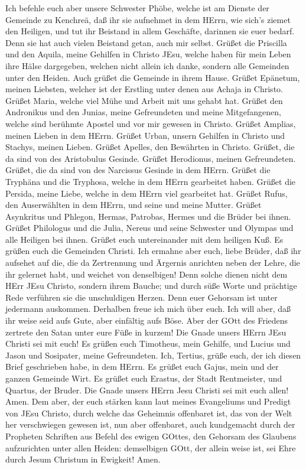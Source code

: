  Ich befehle euch aber unsere Schwester Phöbe, welche ist am
Dienste der Gemeinde zu Kenchreä,  daß ihr sie aufnehmet in
dem HErrn, wie sich's ziemet den Heiligen, und tut ihr Beistand in allem
Geschäfte, darinnen sie euer bedarf. Denn sie hat auch vielen Beistand
getan, auch mir selbst.  Grüßet die Priscilla und den
Aquila, meine Gehilfen in Christo JEsu,  welche haben für
mein Leben ihre Hälse dargegeben, welchen nicht allein ich danke,
sondern alle Gemeinden unter den Heiden.  Auch grüßet die
Gemeinde in ihrem Hause. Grüßet Epänetum, meinen Liebsten, welcher ist
der Erstling unter denen aus Achaja in Christo.  Grüßet
Maria, welche viel Mühe und Arbeit mit uns gehabt hat. 
Grüßet den Andronikus und den Junias, meine Gefreundeten und meine
Mitgefangenen, welche sind berühmte Apostel und vor mir gewesen in
Christo.  Grüßet Amplias, meinen Lieben in dem HErrn.
 Grüßet Urban, unsern Gehilfen in Christo und Stachys,
meinen Lieben.  Grüßet Apelles, den Bewährten in Christo.
Grüßet, die da sind von des Aristobulus Gesinde.  Grüßet
Herodionus, meinen Gefreundeten. Grüßet, die da sind von des Narcissus
Gesinde in dem HErrn.  Grüßet die Tryphäna und die
Tryphosa, welche in dem HErrn gearbeitet haben. Grüßet die Persida,
meine Liebe, welche in dem HErrn viel gearbeitet hat. 
Grüßet Rufus, den Auserwählten in dem HErrn, und seine und meine Mutter.
 Grüßet Asynkritus und Phlegon, Hermas, Patrobas, Hermes
und die Brüder bei ihnen.  Grüßet Philologus und die Julia,
Nereus und seine Schwester und Olympas und alle Heiligen bei ihnen.
 Grüßet euch untereinander mit dem heiligen Kuß. Es grüßen
euch die Gemeinden Christi.  Ich ermahne aber euch, liebe
Brüder, daß ihr aufsehet auf die, die da Zertrennung und Ärgernis
anrichten neben der Lehre, die ihr gelernet habt, und weichet von
denselbigen!  Denn solche dienen nicht dem HErr JEsu
Christo, sondern ihrem Bauche; und durch süße Worte und prächtige Rede
verführen sie die unschuldigen Herzen.  Denn euer Gehorsam
ist unter jedermann auskommen. Derhalben freue ich mich über euch. Ich
will aber, daß ihr weise seid aufs Gute, aber einfältig aufs Böse.
 Aber der GOtt des Friedens zertrete den Satan unter eure
Füße in kurzem! Die Gnade unsers HErrn JEsu Christi sei mit euch!
 Es grüßen euch Timotheus, mein Gehilfe, und Lucius und
Jason und Sosipater, meine Gefreundeten.  Ich, Tertius,
grüße euch, der ich diesen Brief geschrieben habe, in dem HErrn.
 Es grüßet euch Gajus, mein und der ganzen Gemeinde Wirt.
Es grüßet euch Erastus, der Stadt Rentmeister, und Quartus, der Bruder.
 Die Gnade unsers HErrn Jesu Christi sei mit euch allen!
Amen.  Dem aber, der euch stärken kann laut meines
Evangeliums und Predigt von JEsu Christo, durch welche das Geheimnis
offenbaret ist, das von der Welt her verschwiegen gewesen ist,
 nun aber offenbaret, auch kundgemacht durch der Propheten
Schriften aus Befehl des ewigen GOttes, den Gehorsam des Glaubens
aufzurichten unter allen Heiden:  demselbigen GOtt, der
allein weise ist, sei Ehre durch Jesum Christum in Ewigkeit! Amen.
